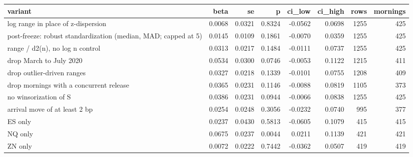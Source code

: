 \begin{tabular}{lrrrrrrr}
\toprule
variant & beta & se & p & ci_low & ci_high & rows & mornings \\
\midrule
log range in place of z-dispersion & 0.0068 & 0.0321 & 0.8324 & -0.0562 & 0.0698 & 1255 & 425 \\
post-freeze: robust standardization (median, MAD; capped at 5) & 0.0145 & 0.0109 & 0.1861 & -0.0070 & 0.0359 & 1255 & 425 \\
range / d2(n), no log n control & 0.0313 & 0.0217 & 0.1484 & -0.0111 & 0.0737 & 1255 & 425 \\
drop March to July 2020 & 0.0534 & 0.0300 & 0.0746 & -0.0053 & 0.1122 & 1215 & 411 \\
drop outlier-driven ranges & 0.0327 & 0.0218 & 0.1339 & -0.0101 & 0.0755 & 1208 & 409 \\
drop mornings with a concurrent release & 0.0365 & 0.0231 & 0.1146 & -0.0088 & 0.0819 & 1105 & 373 \\
no winsorization of S & 0.0386 & 0.0231 & 0.0944 & -0.0066 & 0.0838 & 1255 & 425 \\
arrival move of at least 2 bp & 0.0254 & 0.0248 & 0.3056 & -0.0232 & 0.0740 & 995 & 377 \\
ES only & 0.0237 & 0.0430 & 0.5813 & -0.0605 & 0.1079 & 415 & 415 \\
NQ only & 0.0675 & 0.0237 & 0.0044 & 0.0211 & 0.1139 & 421 & 421 \\
ZN only & 0.0072 & 0.0222 & 0.7442 & -0.0362 & 0.0507 & 419 & 419 \\
\bottomrule
\end{tabular}
